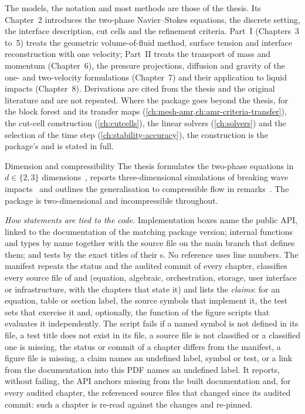 The models, the notation and most methods are those of the thesis. Its
Chapter~2 introduces the two-phase Navier--Stokes equations, the discrete
setting, the interface description, cut cells and the refinement criteria.
Part~I (Chapters~3 to~5) treats the geometric volume-of-fluid method, surface
tension and interface reconstruction with one velocity; Part~II treats the
transport of mass and momentum (Chapter~6), the pressure projections,
diffusion and gravity of the one- and two-velocity formulations (Chapter~7)
and their application to liquid impacts (Chapter~8). Derivations are cited
from the thesis and the original literature and are not repeated. Where the
package goes beyond the thesis, for the block forest and its transfer maps
(\cref{ch:mesh-amr,ch:amr-criteria-transfer}), the cut-cell construction
(\cref{ch:cutcells}), the linear solvers (\cref{ch:solvers}) and the
selection of the time step (\cref{ch:stability-accuracy}), the construction
is the package's and is stated in full.

\begin{deviation}{Dimension and compressibility}\label{dev:overview:scope}
The thesis formulates the two-phase equations in $d\in\{2,3\}$
dimensions~, reports three-dimensional simulations of breaking
wave impacts~ and outlines the generalisation to compressible
flow in remarks~. The package is two-dimensional
and incompressible throughout.
\end{deviation}

\emph{How statements are tied to the code.} Implementation boxes name the
public API, linked to the documentation of the matching package version;
internal functions and types by name together with the source file on the
main branch that defines them; and tests by the exact titles of their
s. No reference uses line numbers. The manifest
 repeats the status and the audited commit of every
chapter, classifies every source file of  and 
(equation, algebraic, orchestration, storage, user interface or
infrastructure, with the chapters that state it) and lists the
\emph{claims}: for an equation, table or section label, the source symbols
that implement it, the test sets that exercise it and, optionally, the
function of the figure scripts that evaluates it independently. The script
 fails if a named symbol is not defined in its file, a
test title does not exist in its file, a source file is not classified or a
classified one is missing, the status or commit of a chapter differs from the
manifest, a figure file is missing, a claim names an undefined label, symbol
or test, or a link from the documentation into this PDF names an undefined
label. It reports, without failing, the API anchors missing from the built
documentation and, for every audited chapter, the referenced source files
that changed since its audited commit: such a chapter is re-read against the
changes and re-pinned.


